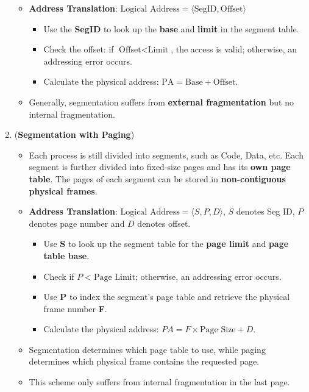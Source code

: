 \documentclass[10pt, landscape]{article}
\begin{document}
\begin{multicols}{4}
\begin{enumerate}
\begin{itemize}
        \item \textbf{Address Translation}: $\text{Logical Address}=\langle\text{SegID},\text{Offset}\rangle$
        \begin{itemize}
            \item Use the \textbf{SegID} to look up the \textbf{base} and \textbf{limit} in the segment table.
            \item Check the offset: if $\text{Offset} < \text{Limit}$, the access is valid; otherwise, an addressing error occurs.
            \item Calculate the physical address: $\text{PA} = \text{Base} + \text{Offset}$.
        \end{itemize}
        \item Generally, segmentation suffers from \textbf{external fragmentation} but no internal fragmentation.
    \end{itemize}
    \item (\textbf{Segmentation with Paging})
    \begin{itemize}
        \item Each process is still divided into segments, such as Code, Data, etc. Each segment is further divided into fixed-size pages and has its \textbf{own page table}. The pages of each segment can be stored in \textbf{non-contiguous physical frames}.
        \item \textbf{Address Translation}: $\text{Logical Address}=\langle S,P,D\rangle$, $S$ denotes Seg ID, $P$ denotes page number and $D$ denotes offset.
        \begin{itemize}
            \item Use \textbf{S} to look up the segment table for the \textbf{page limit} and \textbf{page table base}.
            \item Check if $P < \text{Page Limit}$; otherwise, an addressing error occurs.
            \item Use \textbf{P} to index the segment's page table and retrieve the physical frame number \textbf{F}.
            \item Calculate the physical address: $PA = F \times \text{Page Size} + D$.
        \end{itemize}
        \item Segmentation determines which page table to use, while paging determines which physical frame contains the requested page.
        \item This scheme only suffers from internal fragmentation in the last page.
    \end{itemize}

\end{enumerate}
\end{multicols}
\end{document}
